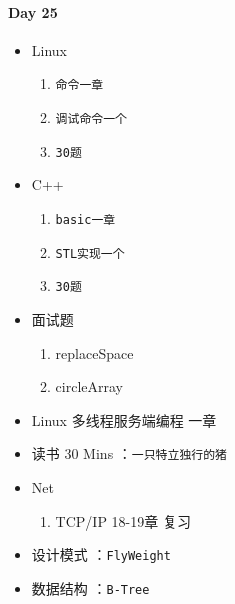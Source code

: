 \documentclass[UTF8,a4paper,8pt]{ctexart}
\begin{document}
 	 \paragraph{Day 25      \quad     }
	 	  \begin{itemize}[itemindent = 1em]
	 	  	\renewcommand\labelitemi{\makebox[0pt][l]{$\square$}\hspace{1em}} 
	 	  	\renewcommand\labelitemi{\makebox[0pt][l]{$\square$}\raisebox{.15ex}{\hspace{0.1em}$\checkmark$}}	 	
	 	  	\item   Linux 
	 	  	\begin{enumerate}
	 	  		\item \verb|命令一章|
	 	  		\item \verb|调试命令一个|
	 	  		\item \verb|30题|
	 	  	\end{enumerate}
	 	  	\item   C++   
	 	  	\begin{enumerate}
	 	  		\item \verb|basic一章|
	 	  		\item \verb|STL实现一个|
	 	  		\item \verb|30题|
	 	  	\end{enumerate}
	 	  	
	 	  	\item  面试题
	 	  	\begin{enumerate}
	 	  		\item replaceSpace
	 	  		\item circleArray
	 	  	\end{enumerate}
	 	  	
	 	  	\item  Linux 多线程服务端编程 一章
	 	  	
	 	  	\item   读书  30 Mins	：\verb|一只特立独行的猪|
	 	  	\item   Net
	 	  	\begin{enumerate}
	 	  		\item TCP/IP  18-19章 复习
	 	  	\end{enumerate}	
	 	  	
	 	  	\renewcommand\labelitemi{\makebox[0pt][l]{$\square$}\hspace{1em}}
	 	  	\item   设计模式 ：\verb|FlyWeight| 
	 	  	\item   数据结构 ：\verb|B-Tree| 
	 	  \end{itemize}
 	 
\end{document}
